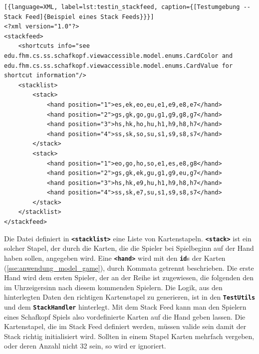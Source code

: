 \documentclass[
							a4paper, 
							11pt, 
							openany, 
							liststotoc,
							parskip=half, 
   							headings=normal
						]{scrreprt}
\begin{document}
{\begin{lstlisting}[{language=XML, label=lst:testin_stackfeed, caption={[Testumgebung -- Stack Feed]{Beispiel eines Stack Feeds}}}]
<?xml version="1.0"?>
<stackfeed>
	<shortcuts info="see edu.fhm.cs.ss.schafkopf.viewaccessible.model.enums.CardColor and edu.fhm.cs.ss.schafkopf.viewaccessible.model.enums.CardValue for shortcut information"/>
	<stacklist>
		<stack>
			<hand position="1">es,ek,eo,eu,e1,e9,e8,e7</hand>
			<hand position="2">gs,gk,go,gu,g1,g9,g8,g7</hand>
			<hand position="3">hs,hk,ho,hu,h1,h9,h8,h7</hand>
			<hand position="4">ss,sk,so,su,s1,s9,s8,s7</hand>
		</stack>
		<stack>
			<hand position="1">eo,go,ho,so,e1,es,e8,g8</hand>
			<hand position="2">gs,gk,ek,gu,g1,g9,eu,g7</hand>
			<hand position="3">hs,hk,e9,hu,h1,h9,h8,h7</hand>
			<hand position="4">ss,sk,e7,su,s1,s9,s8,s7</hand>
		</stack>
	</stacklist>
</stackfeed>
\end{lstlisting}

Die Datei definiert in \textbf{\texttt{{\textless}stacklist{\textgreater}}} eine Liste von Kartenstapeln. \textbf{\texttt{{\textless}stack{\textgreater}}} ist ein solcher Stapel, der durch die Karten, die die Spieler bei Spielbeginn auf der Hand haben sollen, angegeben wird. Eine \textbf{\texttt{{\textless}hand{\textgreater}}} wird mit den \textbf{\texttt{id}}s der Karten (\autoref{sse:anwendung_model_game}), durch Kommata getrennt beschrieben. Die erste Hand wird dem ersten Spieler, der an der Reihe ist zugewiesen, die folgenden den im Uhrzeigersinn nach diesem kommenden Spielern. Die Logik, aus den hinterlegten Daten den richtigen Kartenstapel zu generieren, ist in den \textbf{\texttt{TestUtils}} und dem \textbf{\texttt{StackHandler}} hinterlegt.\newline
Mit dem Stack Feed kann man den Spielern eines Schafkopf Spiels also vordefinierte Karten auf die Hand geben lassen. Die Kartenstapel, die im Stack Feed definiert werden, müssen valide sein damit der Stack richtig initialisiert wird. Sollten in einem Stapel Karten mehrfach vergeben, oder deren Anzahl nicht 32 sein, so wird er ignoriert.

\clearpage

}
\end{document}
